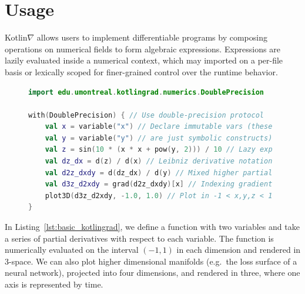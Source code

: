 \documentclass[12pt,initial,twoside,maitrise]{dms}
\numberwithin{equation}{section}
\numberwithin{table}{chapter}
\numberwithin{figure}{chapter}
\begin{document}
\section{Usage}

Kotlin$\nabla$ allows users to implement differentiable programs by composing operations on numerical fields to form algebraic expressions. Expressions are lazily evaluated inside a numerical context, which may imported on a per-file basis or lexically scoped for finer-grained control over the runtime behavior.

\begin{figure}[!htb]
\begin{lstlisting}[caption={A basic Kotlin$\nabla$ program with two inputs and one output.},label={lst:basic_kotlingrad}, language=Kotlin]
import edu.umontreal.kotlingrad.numerics.DoublePrecision

with(DoublePrecision) { // Use double-precision protocol
    val x = variable("x") // Declare immutable vars (these
    val y = variable("y") // are just symbolic constructs)
    val z = sin(10 * (x * x + pow(y, 2))) / 10 // Lazy exp
    val dz_dx = d(z) / d(x) // Leibniz derivative notation
    val d2z_dxdy = d(dz_dx) / d(y) // Mixed higher partial
    val d3z_d2xdy = grad(d2z_dxdy)[x] // Indexing gradient
    plot3D(d3z_d2xdy, -1.0, 1.0) // Plot in -1 < x,y,z < 1
}
\end{lstlisting}
\label{label:basic_kotlingrad}
\end{figure}

In Listing~\ref{lst:basic_kotlingrad}, we define a function with two variables and take a series of partial derivatives with respect to each variable. The function is numerically evaluated on the interval $(-1, 1)$ in each dimension and rendered in 3-space. We can also plot higher dimensional manifolds (e.g.\ the loss surface of a neural network), projected into four dimensions, and rendered in three, where one axis is represented by time.
\end{document}
